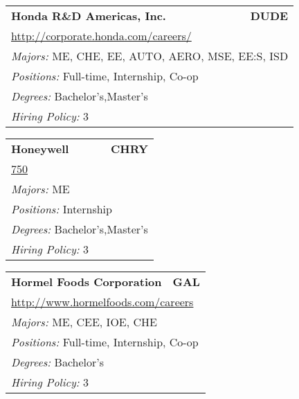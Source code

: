 \documentclass[twoside]{article}
\begin{document}
\begin{center}
\begin{multicols}{3}
\begin{FlushLeft}
\begin{minipage}{.9\columnwidth}
\end{minipage}
 
\begin{minipage}{.9\columnwidth}\begin{tabularx}{.95\columnwidth}{Xr}
                 {\Large\bf Honda R\&D Americas, Inc.} & {\Large\bf DUDE}\\
    \multicolumn{2}{p{.95\columnwidth}}{\url{http://corporate.honda.com/careers/}}\\
    \multicolumn{2}{p{.95\columnwidth}}{\emph{Majors:} ME, CHE, EE, AUTO, AERO, MSE, EE:S, ISD}\\
    \multicolumn{2}{p{.95\columnwidth}}{\emph{Positions:} Full-time, Internship, Co-op}\\
    \multicolumn{2}{p{.95\columnwidth}}{\emph{Degrees:} Bachelor's,Master's}\\
    \multicolumn{2}{p{.95\columnwidth}}{\emph{Hiring Policy:} 3}\\
    \end{tabularx}
    
\end{minipage}
 
\begin{minipage}{.9\columnwidth}\begin{tabularx}{.95\columnwidth}{Xr}
                 {\Large\bf Honeywell} & {\Large\bf CHRY}\\
    \multicolumn{2}{p{.95\columnwidth}}{\url{750}}\\
    \multicolumn{2}{p{.95\columnwidth}}{\emph{Majors:} ME}\\
    \multicolumn{2}{p{.95\columnwidth}}{\emph{Positions:} Internship}\\
    \multicolumn{2}{p{.95\columnwidth}}{\emph{Degrees:} Bachelor's,Master's}\\
    \multicolumn{2}{p{.95\columnwidth}}{\emph{Hiring Policy:} 3}\\
    \end{tabularx}
    
\end{minipage}
 
\begin{minipage}{.9\columnwidth}\begin{tabularx}{.95\columnwidth}{Xr}
                 {\Large\bf Hormel Foods Corporation} & {\Large\bf GAL}\\
    \multicolumn{2}{p{.95\columnwidth}}{\url{http://www.hormelfoods.com/careers}}\\
    \multicolumn{2}{p{.95\columnwidth}}{\emph{Majors:} ME, CEE, IOE, CHE}\\
    \multicolumn{2}{p{.95\columnwidth}}{\emph{Positions:} Full-time, Internship, Co-op}\\
    \multicolumn{2}{p{.95\columnwidth}}{\emph{Degrees:} Bachelor's}\\
    \multicolumn{2}{p{.95\columnwidth}}{\emph{Hiring Policy:} 3}\\
    \end{tabularx}
    

\end{minipage}
\end{FlushLeft}
\end{multicols}
\end{center}
\end{document}
